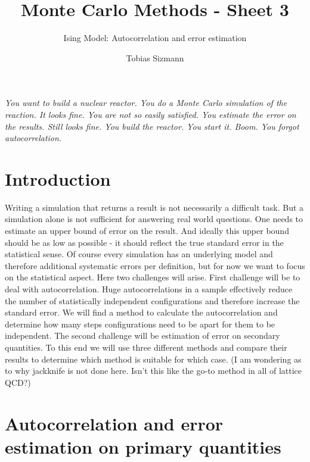 \documentclass[11pt, a4paper]{scrartcl}
\title{Monte Carlo Methods - Sheet 3}
\subtitle{Ising Model: Autocorrelation and error estimation}
\author{Tobias Sizmann}
\begin{document}
\maketitle
\textit{You want to build a nuclear reactor. You do a Monte Carlo simulation of the reaction. It looks fine. You are not so easily satisfied. You estimate the error on the results. Still looks fine. You build the reactor. You start it. Boom. You forgot autocorrelation.}
\section{Introduction}
    Writing a simulation that returns a result is not necessarily a difficult task. But a simulation alone is not sufficient for answering real world questions. One needs to estimate an upper bound of error on the result. And ideally this upper bound should be as low as possible - it should reflect the true standard error in the statistical sense. Of course every simulation has an underlying model and therefore additional systematic errors per definition, but for now we want to focus on the statistical aspect. Here two challenges will arise. First challenge will be to deal with autocorrelation. Huge autocorrelations in a sample effectively reduce the number of statistically independent configurations and therefore increase the standard error. We will find a method to calculate the autocorrelation and determine how many steps configurations need to be apart for them to be independent. The second challenge will be estimation of error on secondary quantities. To this end we will use three different methods and compare their results to determine which method is suitable for which case. (I am wondering as to why jackknife is not done here. Isn't this like the go-to method in all of lattice QCD?)
\section{Autocorrelation and error estimation on primary quantities}
\end{document}
